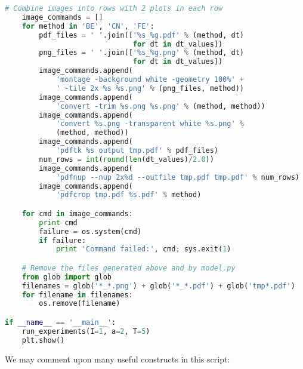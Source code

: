 \documentclass[graybox,sectrefs,envcountresetchap,open=right,final]{svmonodo}
\begin{document}
\begin{lstlisting}[language=Python,style=blue1bar_bluegreen]
    # Combine images into rows with 2 plots in each row
    image_commands = []
    for method in 'BE', 'CN', 'FE':
        pdf_files = ' '.join(['%s_%g.pdf' % (method, dt)
                              for dt in dt_values])
        png_files = ' '.join(['%s_%g.png' % (method, dt)
                              for dt in dt_values])
        image_commands.append(
            'montage -background white -geometry 100%' +
            ' -tile 2x %s %s.png' % (png_files, method))
        image_commands.append(
            'convert -trim %s.png %s.png' % (method, method))
        image_commands.append(
            'convert %s.png -transparent white %s.png' %
            (method, method))
        image_commands.append(
            'pdftk %s output tmp.pdf' % pdf_files)
        num_rows = int(round(len(dt_values)/2.0))
        image_commands.append(
            'pdfnup --nup 2x%d --outfile tmp.pdf tmp.pdf' % num_rows)
        image_commands.append(
            'pdfcrop tmp.pdf %s.pdf' % method)

    for cmd in image_commands:
        print cmd
        failure = os.system(cmd)
        if failure:
            print 'Command failed:', cmd; sys.exit(1)

    # Remove the files generated above and by model.py
    from glob import glob
    filenames = glob('*_*.png') + glob('*_*.pdf') + glob('tmp*.pdf')
    for filename in filenames:
        os.remove(filename)

if __name__ == '__main__':
    run_experiments(I=1, a=2, T=5)
    plt.show()
\end{lstlisting}

 

We may comment upon many useful constructs in this script:
\end{document}
